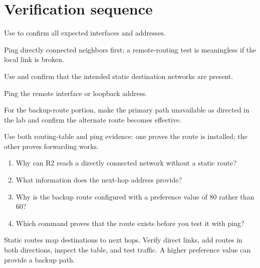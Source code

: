 \section{Verification sequence}
\begin{netsteps}
\item Use  to confirm all expected interfaces and addresses.
\item Ping directly connected neighbors first; a remote-routing test is meaningless if the local link is broken.
\item Use  and confirm that the intended static destination networks are present.
\item Ping the remote interface or loopback address.
\item For the backup-route portion, make the primary path unavailable as directed in the lab and confirm the alternate route becomes effective.
\end{netsteps}

\begin{verification}
Use both routing-table and ping evidence: one proves the route is installed; the other proves forwarding works.
\end{verification}

\begin{quickcheck}
\begin{enumerate}
\item Why can R2 reach a directly connected network without a static route?
\item What information does the next-hop address provide?
\item Why is the backup route configured with a preference value of 80 rather than 60?
\item Which command proves that the route exists before you test it with ping?
\end{enumerate}
\end{quickcheck}

\begin{chapterrecap}
Static routes map destinations to next hops. Verify direct links, add routes in both directions, inspect the table, and test traffic. A higher preference value can provide a backup path.
\end{chapterrecap}


